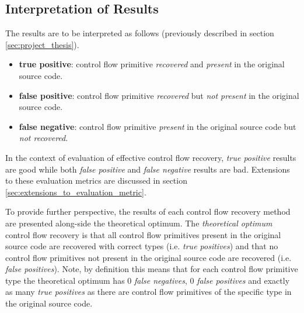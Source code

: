 
\subsection{Interpretation of Results}
\label{sec:interpretation_of_results}

The results are to be interpreted as follows (previously described in section \ref{sec:project_thesis}).

\begin{itemize}
	\item \textbf{true positive}: control flow primitive \textit{recovered} and \textit{present} in the original source code.
	\item \textbf{false positive}: control flow primitive \textit{recovered} but \textit{not present} in the original source code.
	\item \textbf{false negative}: control flow primitive \textit{present} in the original source code but \textit{not recovered}.
\end{itemize}

In the context of evaluation of effective control flow recovery, \textit{true positive} results are good while both \textit{false positive} and \textit{false negative} results are bad. Extensions to these evaluation metrics are discussed in section \ref{sec:extensions_to_evaluation_metric}.

To provide further perspective, the results of each control flow recovery method are presented along-side the theoretical optimum. The \textit{theoretical optimum} control flow recovery is that all control flow primitives present in the original source code are recovered with correct types (i.e. \textit{true positives}) and that no control flow primitives not present in the original source code are recovered (i.e. \textit{false positives}). Note, by definition this means that for each control flow primitive type the theoretical optimum has 0 \textit{false negatives}, 0 \textit{false positives} and exactly as many \textit{true positives} as there are control flow primitives of the specific type in the original source code.
